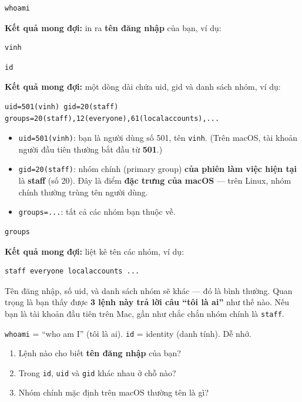 \documentclass[12pt,a4paper]{article}
\newcommand{\cmd}[1]{\texttt{#1}}
\begin{document}
\begin{labbox}
\begin{Verbatim}
whoami
\end{Verbatim}
\textbf{Kết quả mong đợi:} in ra \textbf{tên đăng nhập} của bạn, ví dụ:
\begin{Verbatim}
vinh
\end{Verbatim}

\begin{Verbatim}
id
\end{Verbatim}
\textbf{Kết quả mong đợi:} một dòng dài chứa uid, gid và danh sách nhóm, ví dụ:
\begin{Verbatim}
uid=501(vinh) gid=20(staff) groups=20(staff),12(everyone),61(localaccounts),...
\end{Verbatim}
\begin{itemize}
\item \cmd{uid=501(vinh)}: bạn là người dùng số 501, tên \cmd{vinh}. (Trên macOS,
  tài khoản người đầu tiên thường bắt đầu từ \textbf{501}.)
\item \cmd{gid=20(staff)}: nhóm chính (primary group) \textbf{của phiên làm việc
  hiện tại} là \textbf{staff} (số 20). Đây là điểm \textbf{đặc trưng của macOS} ---
  trên Linux, nhóm chính thường trùng tên người dùng.
\item \cmd{groups=...}: tất cả các nhóm bạn thuộc về.
\end{itemize}

\begin{Verbatim}
groups
\end{Verbatim}
\textbf{Kết quả mong đợi:} liệt kê tên các nhóm, ví dụ:
\begin{Verbatim}
staff everyone localaccounts ...
\end{Verbatim}
\end{labbox}

\begin{notebox}
Tên đăng nhập, số uid, và danh sách nhóm sẽ khác --- đó là bình thường. Quan trọng
là bạn thấy được \textbf{3 lệnh này trả lời câu ``tôi là ai''} như thế nào. Nếu bạn
là tài khoản đầu tiên trên Mac, gần như chắc chắn nhóm chính là \cmd{staff}.
\end{notebox}

\begin{notebox}
\cmd{whoami} = ``who am I'' (tôi là ai). \cmd{id} = identity (danh tính). Dễ nhớ.
\end{notebox}

\begin{checkbox}
\begin{enumerate}
\item Lệnh nào cho biết \textbf{tên đăng nhập} của bạn?
\item Trong \cmd{id}, \cmd{uid} và \cmd{gid} khác nhau ở chỗ nào?
\item Nhóm chính mặc định trên macOS thường tên là gì?
\end{enumerate}
\end{checkbox}
\end{document}
